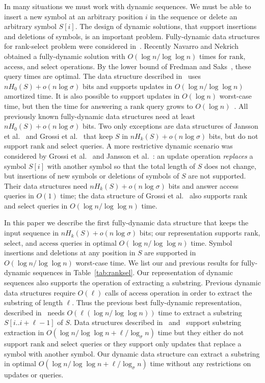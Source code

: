 \documentclass[11pt]{article}\usepackage{fullpage}
\def\idrm#1{\ensuremath{\mathrm{#1}}}
\newcommand{\ra}{\idrm{rank}}
\newcommand{\sel}{\idrm{select}}
\newcommand{\acc}{\idrm{access}}
\begin{document}
In many situations we must work with dynamic sequences. We must be able to insert a new symbol at an arbitrary 
position $i$ in the sequence or delete an arbitrary symbol $S[i]$.  The design of dynamic solutions, that support insertions and deletions of symbols, is an important problem.  Fully-dynamic data structures for rank-select problem were considered in~\cite{HSS03,CHL04,BB04,MN06,CHLS07,GHSV07,MN08,HSS11}. 
Recently Navarro and Nekrich~\cite{NavarroN13,NavarroN13a} obtained a fully-dynamic solution with $O(\log n/\log \log n)$ times for $\ra$, $\acc$, and $\sel$ operations. By the lower bound of Fredman and Saks~\cite{FS89}, these query times are optimal.  The data structure described in~\cite{NavarroN13} uses $nH_0(S)+o(n\log\sigma)$ bits and supports updates in $O(\log n/\log \log n)$ amortized time. It is also possible to support updates in $O(\log n)$ worst-case time, but then the time for answering a $\ra$ query grows to $O(\log n)$~\cite{NavarroN13a}. All previously known fully-dynamic data structures need at least $nH_0(S)+o(n\log\sigma)$ bits. Two only exceptions are data structures of Jansson et al.~\cite{JanssonSS12} and Grossi et al.~\cite{GrossiRRV13} that keep $S$ in $nH_k(S)+o(n\log\sigma)$ bits, but do not support $\ra$ and $\sel$ queries. 
A more restrictive dynamic scenario was considered by Grossi et al.~\cite{GrossiRRV13} and Jansson et al.~\cite{JanssonSS12}: an update operation \emph{replaces} a symbol $S[i]$ with another symbol so that the total length of $S$ does not change, but insertions of new symbols or deletions of symbols of $S$ are not supported.  Their data structures need $nH_k(S)+ o(n \log\sigma)$ bits and answer access queries in $O(1)$ time; the data structure of Grossi et al.~\cite{GrossiRRV13} also supports rank and select queries in $O(\log n/\log\log n)$ time.

In this paper we describe the first fully-dynamic data structure 
that keeps the input sequence in $nH_k(S)+o(n\log\sigma)$ bits; our representation supports $\ra$, $\sel$, and $\acc$ queries 
in optimal $O(\log n/\log \log n)$ time. 
Symbol insertions and deletions at any position in $S$ are supported in $O(\log n/\log \log n)$ worst-case time.
We list our and previous results for fully-dynamic sequences in Table~\ref{tab:ranksel}. 
Our representation of dynamic sequences also supports the operation of extracting a substring. Previous dynamic data structures 
require $O(\ell)$ calls of $\acc$ operation in order to extract the substring of length $\ell$. Thus the previous best fully-dynamic 
representation, described in~\cite{NavarroN13} needs $O(\ell(\log n/\log\log n))$ time to extract a substring $S[i..i+\ell-1]$ of $S$. Data structures described in~\cite{GrossiRRV13} and~\cite{JanssonSS12} support substring extraction in $O(\log n/\log\log n+\ell/\log_{\sigma}n)$ time but they either do not support $\ra$ and $\sel$ queries or they support only updates that replace a symbol with another symbol. Our dynamic data structure can extract a substring in optimal $O(\log n/\log\log n+\ell/\log_{\sigma}n)$ time without any restrictions on updates or queries. 
\end{document}

